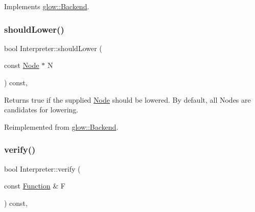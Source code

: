 Implements \hyperlink{classglow_1_1_backend_a386f7e534956c47f8a6b1457d6e87c67}{glow\+::\+Backend}.

\mbox{\label{classglow_1_1_interpreter_a4af3e91f6b07d5f896b8db8b4e4d2df4}} 
\subsubsection{\texorpdfstring{should\+Lower()}{shouldLower()}}
{\footnotesize\ttfamily bool Interpreter\+::should\+Lower (\begin{DoxyParamCaption}\item[{const \hyperlink{classglow_1_1_node}{Node} $\ast$}]{N }\end{DoxyParamCaption}) const\hspace{0.3cm}{\ttfamily [override]}, {\ttfamily [virtual]}}

\begin{DoxyReturn}{Returns}
true if the supplied \hyperlink{classglow_1_1_node}{Node}  should be lowered. By default, all Nodes are candidates for lowering. 
\end{DoxyReturn}


Reimplemented from \hyperlink{classglow_1_1_backend_aba5bec08f5e60626bcc5238f410d632a}{glow\+::\+Backend}.

\mbox{\label{classglow_1_1_interpreter_a9dd7a307318bd87414bac5d8cabf5a6f}} 
\subsubsection{\texorpdfstring{verify()}{verify()}\hspace{0.1cm}{\footnotesize\ttfamily [1/2]}}
{\footnotesize\ttfamily bool Interpreter\+::verify (\begin{DoxyParamCaption}\item[{const \hyperlink{classglow_1_1_function}{Function} \&}]{F }\end{DoxyParamCaption}) const\hspace{0.3cm}{\ttfamily [override]}, {\ttfamily [virtual]}}

